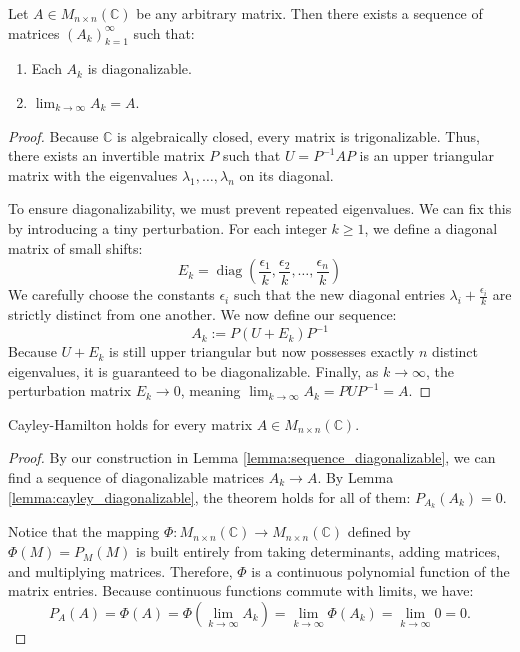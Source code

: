 \begin{lemma}\label{lemma:sequence_diagonalizable}
  Let $A \in M_{n \times n}(\mathbb{C})$ be any arbitrary matrix. Then there exists a sequence of matrices $(A_k)_{k=1}^\infty$ such that:
  \begin{enumerate}
    \item Each $A_k$ is diagonalizable.
    \item $\lim_{k \to \infty} A_k = A$.
  \end{enumerate}
\end{lemma}

\begin{proof}
  Because $\mathbb{C}$ is algebraically closed, every matrix is trigonalizable. Thus, there exists an invertible matrix $P$ such that $U = P^{-1} A P$ is an upper triangular matrix with the eigenvalues $\lambda_1, \dots, \lambda_n$ on its diagonal.

  To ensure diagonalizability, we must prevent repeated eigenvalues. We can fix this by introducing a tiny perturbation. For each integer $k \ge 1$, we define a diagonal matrix of small shifts:
  \[
  E_k = \operatorname{diag}\left(\frac{\epsilon_1}{k}, \frac{\epsilon_2}{k}, \dots, \frac{\epsilon_n}{k}\right)
  \]
  We carefully choose the constants $\epsilon_i$ such that the new diagonal entries $\lambda_i + \frac{\epsilon_i}{k}$ are strictly distinct from one another. We now define our sequence:
  \[
  A_k := P (U + E_k) P^{-1}
  \]
  Because $U + E_k$ is still upper triangular but now possesses exactly $n$ distinct eigenvalues, it is guaranteed to be diagonalizable. Finally, as $k \to \infty$, the perturbation matrix $E_k \to 0$, meaning $\lim_{k \to \infty} A_k = P U P^{-1} = A$.
\end{proof}

\begin{lemma}\label{lemma:cayley_C}
  Cayley-Hamilton holds for every matrix $A \in M_{n \times n}(\mathbb{C})$.
\end{lemma}

\begin{proof}
  By our construction in Lemma \ref{lemma:sequence_diagonalizable}, we can find a sequence of diagonalizable matrices $A_k \to A$. By Lemma \ref{lemma:cayley_diagonalizable}, the theorem holds for all of them: $P_{A_k}(A_k) = 0$.

  Notice that the mapping $\Phi: M_{n \times n}(\mathbb{C}) \to M_{n \times n}(\mathbb{C})$ defined by $\Phi(M) = P_M(M)$ is built entirely from taking determinants, adding matrices, and multiplying matrices. Therefore, $\Phi$ is a continuous polynomial function of the matrix entries. Because continuous functions commute with limits, we have:
  \[
  P_A(A) = \Phi(A) = \Phi\left(\lim_{k \to \infty} A_k\right) = \lim_{k \to \infty} \Phi(A_k) = \lim_{k \to \infty} 0 = 0.
  \]
\end{proof}

